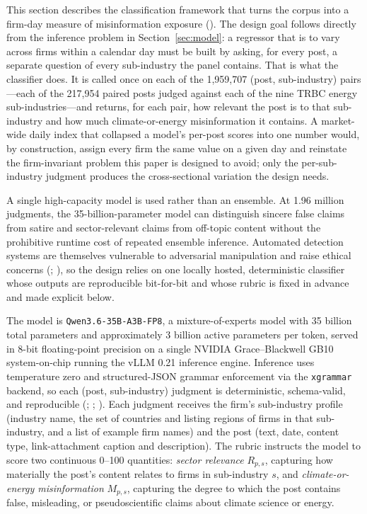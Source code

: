\documentclass{article}
\theoremstyle{plain}
\begin{document}
This section describes the classification framework that turns the corpus into a firm-day measure of misinformation exposure (\cite{WardleDerakhshan2017}). The design goal follows directly from the inference problem in Section~\ref{sec:model}: a regressor that is to vary across firms within a calendar day must be built by asking, for every post, a separate question of every sub-industry the panel contains. That is what the classifier does. It is called once on each of the 1,959,707 (post, sub-industry) pairs---each of the 217,954 paired posts judged against each of the nine TRBC energy sub-industries---and returns, for each pair, how relevant the post is to that sub-industry and how much climate-or-energy misinformation it contains. A market-wide daily index that collapsed a model's per-post scores into one number would, by construction, assign every firm the same value on a given day and reinstate the firm-invariant problem this paper is designed to avoid; only the per-sub-industry judgment produces the cross-sectional variation the design needs.

A single high-capacity model is used rather than an ensemble. At 1.96 million judgments, the 35-billion-parameter model can distinguish sincere false claims from satire and sector-relevant claims from off-topic content without the prohibitive runtime cost of repeated ensemble inference. Automated detection systems are themselves vulnerable to adversarial manipulation and raise ethical concerns (\cite{QiuLiuZhou&Huang2022}; \cite{HorneNevo&Smith2023}), so the design relies on one locally hosted, deterministic classifier whose outputs are reproducible bit-for-bit and whose rubric is fixed in advance and made explicit below.

The model is \texttt{Qwen3.6-35B-A3B-FP8}, a mixture-of-experts model with 35 billion total parameters and approximately 3 billion active parameters per token, served in 8-bit floating-point precision on a single NVIDIA Grace--Blackwell GB10 system-on-chip running the vLLM 0.21 inference engine. Inference uses temperature zero and structured-JSON grammar enforcement via the \texttt{xgrammar} backend, so each (post, sub-industry) judgment is deterministic, schema-valid, and reproducible (\cite{westwood2025measuring}; \cite{gilardi2023chatgpt}; \cite{santurkar2023whose}). Each judgment receives the firm's sub-industry profile (industry name, the set of countries and listing regions of firms in that sub-industry, and a list of example firm names) and the post (text, date, content type, link-attachment caption and description). The rubric instructs the model to score two continuous 0--100 quantities: \emph{sector relevance} $R_{p,s}$, capturing how materially the post's content relates to firms in sub-industry $s$, and \emph{climate-or-energy misinformation} $M_{p,s}$, capturing the degree to which the post contains false, misleading, or pseudoscientific claims about climate science or energy.
\end{document}
